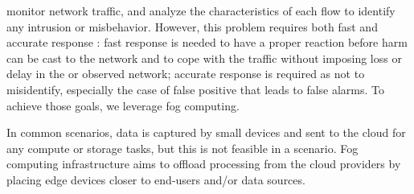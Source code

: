 
\nids 
monitor network traffic, and analyze the characteristics of each flow 
to identify any intrusion or misbehavior.
However, this problem requires both fast and accurate response \cite{DaCosta2019a}:
fast response is needed to have a proper reaction before harm can be cast
to the network and to cope with the traffic without imposing loss or delay
in the \nids or observed network;
accurate response is required as not to misidentify,
especially the case of false positive that leads to false alarms.
To achieve those goals, we leverage fog computing.


In common \iot scenarios, data is captured by small devices and sent to the
cloud for any compute or storage tasks, but this is not feasible in a \nids
scenario.
Fog computing infrastructure aims to offload processing from the cloud
providers by placing edge devices closer to end-users and/or data sources.

